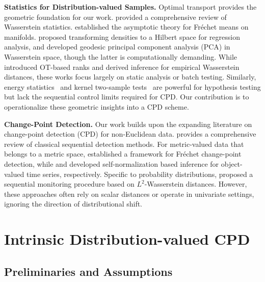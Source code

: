 \documentclass{article}
\theoremstyle{plain}
\theoremstyle{definition}
\theoremstyle{remark}
\begin{document}
\textbf{Statistics for Distribution-valued Samples.} Optimal transport provides the geometric foundation for our work. 
\citet{panaretos2019statistical} provided a comprehensive review of Wasserstein statistics.
\citet{bhattacharya2005large} established the asymptotic theory for Fréchet means on manifolds.
\citet{petersen2016functional} proposed transforming densities to a Hilbert space for regression analysis, and \citet{bigot2017geodesic} developed geodesic principal component analysis (PCA) in Wasserstein space, though the latter is computationally demanding. 
While \citet{chernozhukov2017monge} introduced OT-based ranks and \citet{sommerfeld2018inference} derived inference for empirical Wasserstein distances, these works focus largely on static analysis or batch testing. 
Similarly, energy statistics~\citep{szekely2013energy} and kernel two-sample tests~\citep{gretton2012kernel} are powerful for hypothesis testing but lack the sequential control limits required for CPD. Our contribution is to operationalize these geometric insights into a CPD scheme.

\textbf{Change-Point Detection.} 
Our work builds upon the expanding literature on change-point detection (CPD) for non-Euclidean data. 
\citet{xie2021sequential} provides a comprehensive review of classical sequential detection methods.
For metric-valued data that belongs to a metric space, \citet{dubey2020frechet} established a framework for Fr\'echet change-point detection, while \citet{zhang2025change} and \citet{jiang2024two} developed self-normalization based inference for object-valued time series, respectively. 
Specific to probability distributions, \citet{horvath2021monitoring} proposed a sequential monitoring procedure based on $L^2$-Wasserstein distances. However, these approaches often rely on scalar distances or operate in univariate settings, ignoring the direction of distributional shift.

\section{Intrinsic Distribution-valued CPD}
\subsection{Preliminaries and Assumptions}
\end{document}
